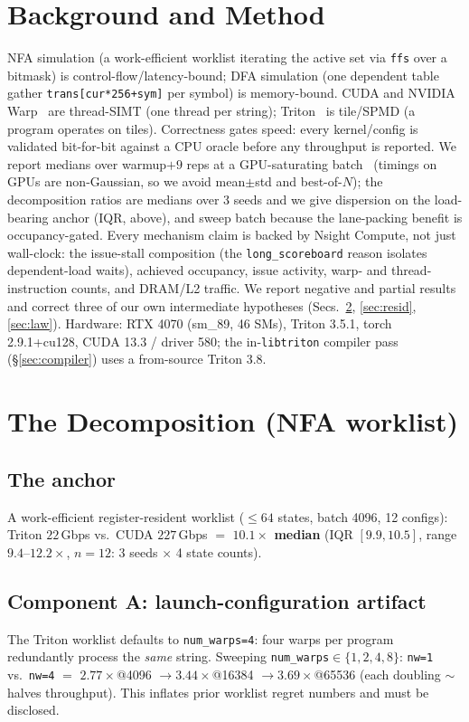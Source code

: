 \documentclass[manuscript,review,anonymous]{acmart}
\begin{document}
\section{Background and Method}
NFA simulation (a work-efficient worklist iterating the active set via \texttt{ffs} over a bitmask) is
control-flow/latency-bound; DFA simulation (one dependent table gather \texttt{trans[cur*256+sym]} per
symbol) is memory-bound. CUDA and NVIDIA Warp~\cite{warp2022} are thread-SIMT (one thread per string);
Triton~\cite{triton2019} is tile/SPMD (a program operates on tiles). Correctness gates speed: every
kernel/config is validated bit-for-bit against a CPU oracle before any throughput is reported. We
report medians over warmup${+}9$ reps at a GPU-saturating batch~\cite{hoefler2015} (timings on GPUs
are non-Gaussian, so we avoid mean$\pm$std and best-of-$N$); the decomposition ratios are medians over 3
seeds and we give dispersion on the load-bearing anchor (IQR, above), and sweep batch because the lane-packing
benefit is occupancy-gated. Every mechanism claim is backed by Nsight Compute, not just wall-clock:
the issue-stall composition (the \texttt{long\_scoreboard} reason isolates dependent-load waits),
achieved occupancy, issue activity, warp- and thread-instruction counts, and DRAM/L2 traffic. We report negative and partial results and correct
three of our own intermediate hypotheses (Secs.~\ref{sec:decomp}, \ref{sec:resid}, \ref{sec:law}).
Hardware: RTX 4070 (sm\_89, 46 SMs), Triton 3.5.1, torch 2.9.1+cu128, CUDA 13.3 / driver 580; the
in-\texttt{libtriton} compiler pass (\S\ref{sec:compiler}) uses a from-source Triton 3.8.

\section{The Decomposition (NFA worklist)}\label{sec:decomp}

\subsection{The anchor}
A work-efficient register-resident worklist ($\le 64$ states, batch 4096, 12 configs): Triton
$22$\,Gbps vs.\ CUDA $227$\,Gbps $=$ \textbf{$10.1\times$ median} (IQR $[9.9, 10.5]$, range $9.4$--$12.2\times$, $n{=}12$: 3 seeds $\times$ 4 state counts).

\subsection{Component A: launch-configuration artifact}\label{sec:artifact}
The Triton worklist defaults to \texttt{num\_warps=4}: four warps per program redundantly process the
\emph{same} string. Sweeping \texttt{num\_warps}$\in\{1,2,4,8\}$: \texttt{nw=1} vs.\ \texttt{nw=4} $=$
$2.77\times$@4096 $\rightarrow 3.44\times$@16384 $\rightarrow 3.69\times$@65536 (each doubling
${\sim}$halves throughput). This inflates prior worklist regret numbers and must be disclosed.
\end{document}
